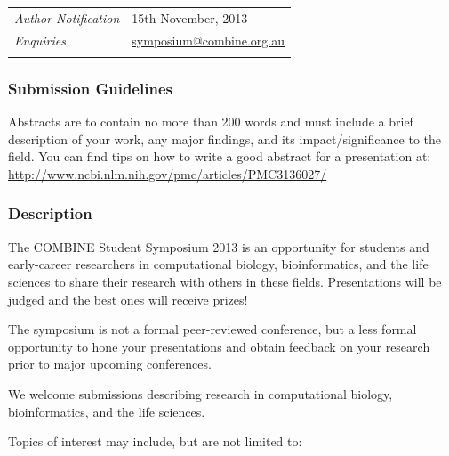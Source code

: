 \documentclass[12pt,]{article}
\begin{document}
\begin{longtable}[c]{@{}ll@{}}
\begin{minipage}[t]{0.30\columnwidth}\raggedright
\emph{Author Notification}
\end{minipage} & \begin{minipage}[t]{0.70\columnwidth}\raggedright
    15th November, 2013
\end{minipage}
\\\noalign{\medskip}

\begin{minipage}[t]{0.30\columnwidth}\raggedright
\emph{Enquiries}
\end{minipage} & \begin{minipage}[t]{0.70\columnwidth}\raggedright
\href{mailto:symposium@combine.org.au}{symposium@combine.org.au}
\end{minipage}
\\\noalign{\medskip}
\hline
\end{longtable}

\subsubsection{Submission Guidelines}

    Abstracts are to contain no more than 200 words and must
    include a brief description of your work, any major findings,
    and its impact/significance to the field.
    You can find tips on how to write a good abstract for a presentation at: \href{http://www.ncbi.nlm.nih.gov/pmc/articles/PMC3136027/}{http://www.ncbi.nlm.nih.gov/pmc/articles/PMC3136027/}

\subsubsection{Description}

The COMBINE Student Symposium 2013 is an opportunity for students and
early-career researchers in computational biology, bioinformatics, and the life
sciences to share their research with others in these fields. Presentations
will be judged and the best ones will receive prizes!

The symposium is not a formal peer-reviewed conference, but a less formal
opportunity to hone your presentations and obtain feedback on your research
prior to major upcoming conferences.

We welcome submissions describing research in computational biology,
bioinformatics, and the life sciences.

Topics of interest may include, but are not limited to:\par\bigskip
\end{document}
